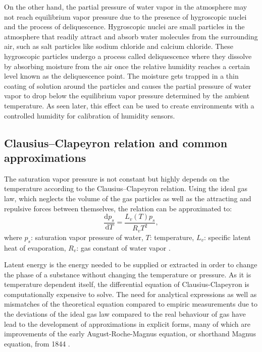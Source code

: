 On the other hand, the partial pressure of water vapor in the atmosphere may not reach equilibrium vapor pressure due to the presence of hygroscopic nuclei and the process of deliquescence. Hygroscopic nuclei are small particles in the atmosphere that readily attract and absorb water molecules from the surrounding air, such as salt particles like sodium chloride and calcium chloride. These hygroscopic particles undergo a process called deliquescence where they dissolve by absorbing moisture from the air once the relative humidity reaches a certain level known as the deliquescence point. The moisture gets trapped in a thin coating of solution around the particles and causes the partial pressure of water vapor to drop below the equilibrium vapor pressure determined by the ambient temperature. As seen later, this effect can be used to create environments with a controlled humidity for calibration of humidity sensors.

\subsection{Clausius–Clapeyron relation and common approximations}
The saturation vapor pressure is not constant but highly depends on the temperature according to the Clausius–Clapeyron relation. Using the ideal gas law, which neglects the volume of the gas particles as well as the attracting and repulsive forces between themselves, the relation can be approximated to:
\begin{equation}\label{e:clausius}
    \frac{\mathrm{d}p_s}{\mathrm{d}T} = \frac{L_v(T) p_s}{R_v T^2},
\end{equation}
where
$p_s$: saturation vapor pressure of water, 
$T$: temperature, 
$L_v$: specific latent heat of evaporation, 
$R_v$: gas constant of water vapor \autocite{iribarneThermodynamicProcessesAtmosphere1981}.

Latent energy is the energy needed to be supplied or extracted in order to change the phase of a substance without changing the temperature or pressure. As it is temperature dependent itself, the differential equation of Clausius-Clapeyron is computationally expensive to solve. The need for analytical expressions as well as mismatches of the theoretical equation compared to empiric measurements due to the deviations of the ideal gas law compared to the real behaviour of gas have lead to the development of approximations in explicit forms, many of which are improvements of the early August-Roche-Magnus equation, or shorthand Magnus equation, from 1844 \autocite{alduchovImprovedMagnusForm1997}.

